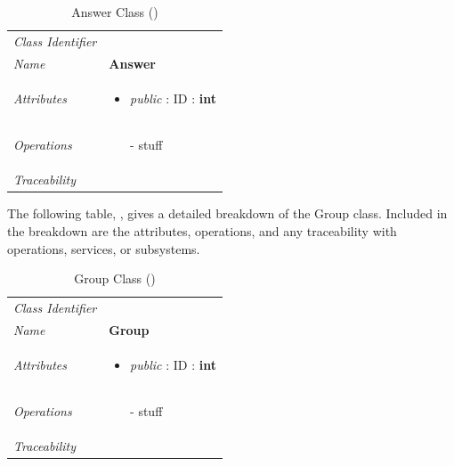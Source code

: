\documentclass[12pt,letterpaper]{article}
\begin{document}
\begin{table}[H]
    \caption{Answer Class ()} 
	\begin{tabu} to 
		\toprule
		Class Identifier &  \\
		Name & {\bf Answer} \\
		Attributes & 
		\begin{minipage}[t]{\linewidth}
		    \begin{itemize}
		        \item \textit{public} : ID : \bf{int}
			\end{itemize}
	    \end{minipage} \\

		Operations &
		\begin{minipage}[t]{\linewidth}
			\begin{enumerate}
			    \item[-] stuff
	        \end{enumerate}
	    \end{minipage} \\
	    	Traceability & \\
		\toprule
	\end{tabu}
\end{table}

The following table, , gives a detailed breakdown of the Group class. Included in the breakdown are the attributes, operations, and any traceability with operations, services, or subsystems.

\begin{table}[H]
    \caption{Group Class ()} 
	\begin{tabu} to 
		\toprule
		Class Identifier &  \\
		Name & {\bf Group} \\
		Attributes & 
		\begin{minipage}[t]{\linewidth}
		    \begin{itemize}
		        \item \textit{public} : ID : \bf{int}
			\end{itemize}
	    \end{minipage} \\

		Operations &
		\begin{minipage}[t]{\linewidth}
			\begin{enumerate}
			    \item[-] stuff
	        \end{enumerate}
	    \end{minipage} \\
	    	Traceability & \\
		\toprule
	\end{tabu}
\end{table}
\end{document}
